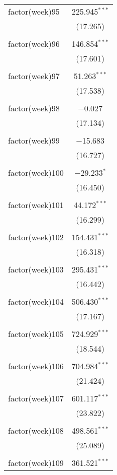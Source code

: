\documentclass{article}
\begin{document}
\begin{table}[!htbp]
\begin{tabular}{@{\extracolsep{5pt}}lc}
 factor(week)95 & 225.945$^{***}$ \\ 
  & (17.265) \\ 
  & \\ 
 factor(week)96 & 146.854$^{***}$ \\ 
  & (17.601) \\ 
  & \\ 
 factor(week)97 & 51.263$^{***}$ \\ 
  & (17.538) \\ 
  & \\ 
 factor(week)98 & $-$0.027 \\ 
  & (17.134) \\ 
  & \\ 
 factor(week)99 & $-$15.683 \\ 
  & (16.727) \\ 
  & \\ 
 factor(week)100 & $-$29.233$^{*}$ \\ 
  & (16.450) \\ 
  & \\ 
 factor(week)101 & 44.172$^{***}$ \\ 
  & (16.299) \\ 
  & \\ 
 factor(week)102 & 154.431$^{***}$ \\ 
  & (16.318) \\ 
  & \\ 
 factor(week)103 & 295.431$^{***}$ \\ 
  & (16.442) \\ 
  & \\ 
 factor(week)104 & 506.430$^{***}$ \\ 
  & (17.167) \\ 
  & \\ 
 factor(week)105 & 724.929$^{***}$ \\ 
  & (18.544) \\ 
  & \\ 
 factor(week)106 & 704.984$^{***}$ \\ 
  & (21.424) \\ 
  & \\ 
 factor(week)107 & 601.117$^{***}$ \\ 
  & (23.822) \\ 
  & \\ 
 factor(week)108 & 498.561$^{***}$ \\ 
  & (25.089) \\ 
  & \\ 
 factor(week)109 & 361.521$^{***}$ \\ 

\end{tabular}
\end{table}
\end{document}
